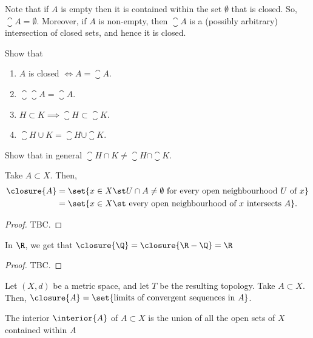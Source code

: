 Note that if $A$ is empty then it is contained within the set $\emptyset$ that is closed. So, $\closure{A} = \emptyset$. Moreover, if $A$ is non-empty, then $\closure{A}$ is a (possibly arbitrary) intersection of closed sets, and hence it is closed.

\begin{exercise}
Show that
\begin{enumerate}
\item $A$ is closed $\iff A = \closure{A}$.
\item $\closure{\closure{A}} = \closure{A}$.
\item $H \subset K \implies \closure{H} \subset \closure{K}$.
\item $\closure{H \cup K} = \closure{H} \cup \closure{K}$.
\end{enumerate}
\end{exercise}

\begin{exercise}
  Show that in general $\closure{H \cap K} \neq \closure{H} \cap \closure{K}$.
\end{exercise}

\begin{nlemma}
  Take $A \subset X$. Then,
  \begin{align*}
    \closure{A} &= \set{x \in X \st U \cap A \neq \emptyset \text{ for every open neighbourhood } U \text{ of } x}\\
    &= \set{x \in X \st \text{ every open neighbourhood of } x \text{ intersects } A}.
  \end{align*}
\end{nlemma}
\begin{proof}
  TBC.
\end{proof}

\begin{ncor}
  In $\R$, we get that $\closure{\Q} = \closure{\R-\Q} = \R$
\end{ncor}
\begin{proof}
  TBC.
\end{proof}

\begin{nprop}
  Let $(X,d)$ be a metric space, and let $T$ be the resulting topology. Take $A \subset X$. Then, $\closure{A} = \set{\text{limits of convergent sequences in }A}$.
\end{nprop}

\begin{ndfn}[Interior]
  The interior $\interior{A}$ of $A \subset X$ is the union of all the open sets of $X$ contained within $A$
\end{ndfn}

